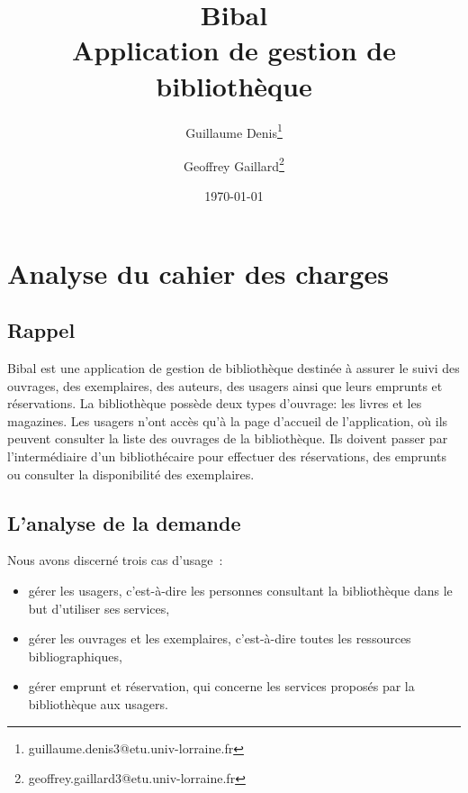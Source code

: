 \documentclass[a4paper,12pt]{article}
\author[]{Guillaume Denis\thanks{guillaume.denis3@etu.univ-lorraine.fr}}
\author[]{Geoffrey Gaillard\thanks{geoffrey.gaillard3@etu.univ-lorraine.fr}}
\affil{Université de Lorraine, UFR Mathématiques et Informatique}
\date{\today}
\title{Bibal \\ \small{Application de gestion de bibliothèque}}
\begin{document}
\vfill

\maketitle

\thispagestyle{empty}

\clearpage


\thispagestyle{empty}

\tableofcontents

\clearpage



\section{Analyse du cahier des charges}
\label{sec:orgheadline3}

\subsection{Rappel}
\label{sec:orgheadline1}

Bibal est une application de gestion de bibliothèque destinée à assurer le suivi
des ouvrages, des exemplaires, des auteurs, des usagers ainsi que leurs emprunts
et réservations. La bibliothèque possède deux types d’ouvrage: les livres et les
magazines. Les usagers n’ont accès qu'à la page d’accueil de l’application, où
ils peuvent consulter la liste des ouvrages de la bibliothèque. Ils doivent
passer par l’intermédiaire d’un bibliothécaire pour effectuer des réservations,
des emprunts ou consulter la disponibilité des exemplaires.

\subsection{L’analyse de la demande}
\label{sec:orgheadline2}



Nous avons discerné trois cas d’usage :
\begin{itemize}
\item gérer les usagers, c'est-à-dire les personnes consultant la bibliothèque dans le but d’utiliser ses services,
\item gérer les ouvrages et les exemplaires, c'est-à-dire toutes les ressources bibliographiques,
\item gérer emprunt et réservation, qui concerne les services proposés par la bibliothèque aux usagers.
\end{itemize}
\end{document}
